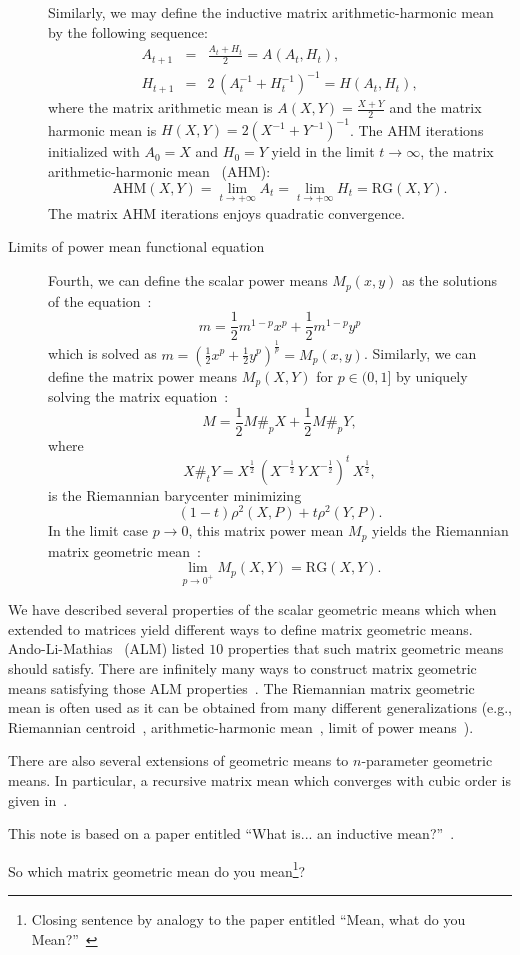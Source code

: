 \documentclass{article}
\def\AHM{\mathrm{AHM}}
\def\RGM{\mathrm{RG}}
\begin{document}
\begin{description}
Similarly, we may define the  inductive matrix arithmetic-harmonic  mean by the following sequence:
\begin{eqnarray*}
A_{t+1} &=& \frac{A_t+H_t}{2}=A(A_t,H_t),\\
H_{t+1} &=& 2\, (A_t^{-1}+H_t^{-1})^{-1}=H(A_t,H_t),
\end{eqnarray*}
where the matrix arithmetic mean is $A(X,Y)=\frac{X+Y}{2}$ and the matrix harmonic mean is $H(X,Y)=2(X^{-1}+Y^{-1})^{-1}$.
The AHM iterations initialized with $A_0=X$ and $H_0=Y$ yield in the limit $t \rightarrow\infty$, the matrix arithmetic-harmonic mean~\cite{AHM-Nakamura-2001} (AHM):
$$
\AHM(X,Y)=\lim_{t\rightarrow +\infty} A_t=\lim_{t\rightarrow +\infty} H_t=\RGM(X,Y).
$$
The matrix AHM iterations enjoys quadratic convergence.



\item[Limits of power mean functional equation] Fourth, we can define the scalar power means $M_p(x,y)$
as the solutions of the equation~\cite{lim2012matrix}:
$$
m=\frac{1}{2} m^{1-p}x^p + \frac{1}{2} m^{1-p}y^p
$$  
which is solved as 
$m=\left(\frac{1}{2}x^p+\frac{1}{2}y^p\right)^{\frac{1}{p}}=M_p(x,y)$.
Similarly, we can define the matrix power means
 $M_p(X,Y)$ for $p\in (0,1]$  
by uniquely solving the matrix equation~\cite{lim2012matrix}:
\begin{equation}\label{eq:mp}
M=\frac{1}{2} M\#_p X + \frac{1}{2}  M\#_p Y,
\end{equation}
where 
$$
X\#_t Y= 
X^{\frac{1}{2}}\, \left(X^{-\frac{1}{2}}\, Y\, X^{-\frac{1}{2}}\right)^t\, X^{\frac{1}{2}},
$$
is the Riemannian barycenter minimizing
$$
(1-t) \rho^2(X,P)+t\rho^2(Y,P).
$$
In the limit case $p\rightarrow 0$, this matrix power mean $M_p$ yields the Riemannian matrix geometric mean~\cite{lim2012matrix}: 
$$
\lim_{p\rightarrow 0^+} M_p(X,Y)=\RGM(X,Y). 
$$
\end{description}

We have described several properties of the scalar geometric means which when extended to matrices yield different ways to define matrix geometric means.
Ando-Li-Mathias~\cite{ALM-2004} (ALM) listed $10$ properties that such matrix geometric means should satisfy.
There are infinitely many ways to construct matrix geometric means satisfying those ALM properties~\cite{bini2010effective}.
The Riemannian matrix geometric mean is often used as it can be obtained from many different generalizations (e.g., Riemannian centroid~\cite{bhatia2012monotonicity}, arithmetic-harmonic mean~\cite{AHM-Nakamura-2001}, limit of power means~\cite{lim2012matrix}).

There are also several extensions of geometric means to $n$-parameter geometric means. 
In particular, a recursive matrix mean which converges with cubic order is given in~\cite{bini2010effective}.

This note is based on a paper entitled ``What is... an inductive mean?''~\cite{Mean-Nielsen-2023}.

So which matrix geometric mean do you mean\footnote{Closing sentence by analogy to the paper entitled ``Mean, what do you Mean?''~\cite{de2016mean}}?



\end{document}
